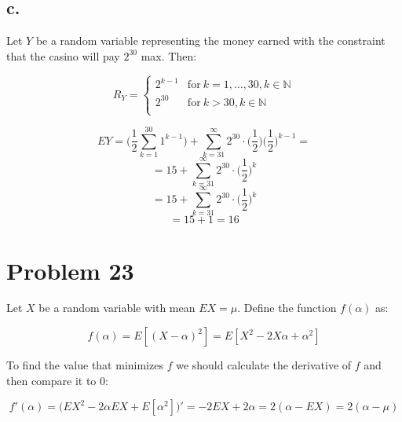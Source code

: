 \documentclass{article}
\begin{document}
\subsection*{c.}

Let \(Y\) be a random variable representing the money earned with the constraint that the casino will pay \(2^{30}\) max.
Then:

\begin{equation*}
    R_{Y} =
    \begin{cases}
        2^{k-1} & \mbox{for} \ k = 1, \dots, 30, k \in \mathbb{N} \\
        2^{30} & \mbox{for} \ k > 30, k \in \mathbb{N}\\
    \end{cases}
\end{equation*}

\begin{equation*}
    EY = \Big( \frac{1}{2} \sum_{k=1}^{30} 1^{k-1} \Big) + \sum_{k=31}^{\infty} 2^{30} \cdot \big(\frac{1}{2}\big) \big( \frac{1}{2} \big)^{k-1} = 
\end{equation*}
\begin{equation*}
    = 15 + \sum_{k=31}^{\infty} 2^{30} \cdot \big( \frac{1}{2} \big)^{k}
\end{equation*}
\begin{equation*}
    = 15 + \sum_{k=31}^{\infty} 2^{30} \cdot \big( \frac{1}{2} \big)^{k}
\end{equation*}
\begin{equation*}
    = 15 + 1 = 16
\end{equation*}


\section*{Problem 23}

Let \(X\) be a random variable with mean \(EX = \mu \). Define the function \(f(\alpha)\) as:

\begin{equation*}
    f(\alpha) = E[(X - \alpha)^{2}] = E[X^{2} - 2X\alpha + \alpha^{2}]
\end{equation*}

To find the value that minimizes \(f\) we should calculate the derivative of \(f\) and then compare it to \(0\):

\begin{equation*}
    f'(\alpha) = \big( EX^{2} - 2\alpha EX + E[\alpha^{2}]\big)' = -2EX + 2 \alpha = 2(\alpha - EX) = 2(\alpha - \mu)
\end{equation*}
\end{document}
